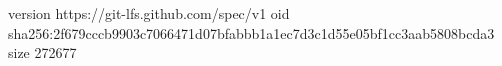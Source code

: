 version https://git-lfs.github.com/spec/v1
oid sha256:2f679cccb9903c7066471d07bfabbb1a1ec7d3c1d55e05bf1cc3aab5808bcda3
size 272677

